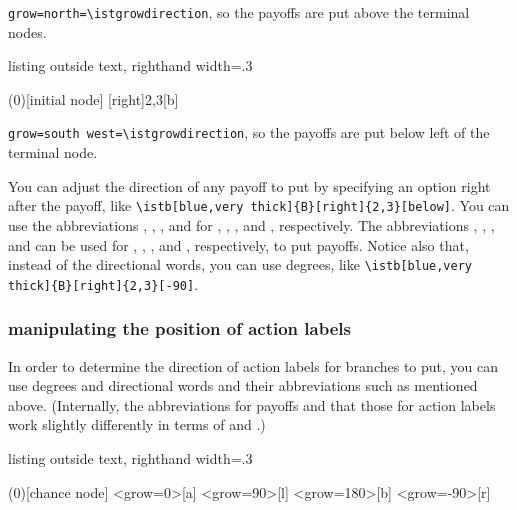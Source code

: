 \verb|grow=north=\istgrowdirection|, so the payoffs are put above the terminal nodes.

\begin{tcblisting}{listing outside text, righthand width=.3\linewidth}
\begin{istgame}
(0)[initial node]
  [right]{2,3}[b]
\endist
\end{istgame}
\end{tcblisting}

\verb|grow=south west=\istgrowdirection|, so the payoffs are put below left of the terminal node.

You can adjust the direction of any payoff to put by specifying an option right after the payoff, like \verb|\istb[blue,very thick]{B}[right]{2,3}[below]|. 
You can use the abbreviations \xword{[l]}, \xword{[r]}, \xword{[a]}, and \xword{[b]} for \xword{[left]}, \xword{[right]}, \xword{[above]}, and \xword{[below]}, respectively.
The abbreviations \xword{[al]}, \xword{[ar]}, \xword{[bl]}, and \xword{[br]} can be used
for , , , and , respectively,
to put payoffs. Notice also that, instead of the directional words, you can use degrees, like \verb|\istb[blue,very thick]{B}[right]{2,3}[-90]|.


\subsubsection*{manipulating the position of action labels}

In order to determine the direction of action labels for branches to put, you can use degrees and directional words and their abbreviations such as mentioned above.
(Internally, the abbreviations for payoffs and that those for action labels work slightly differently in terms of  and .)


\begin{tcblisting}{listing outside text, righthand width=.3\linewidth}
\begin{istgame}[scale=1.2]
\xtShowTerminalNodes
\xtdistance{12mm}{16mm}
\istroot(0)[chance node]
  \istb<grow=0>{}[a]
  \istb<grow=90>{}[l]
  \istb<grow=180>{}[b]
  \istb<grow=-90>{}[r]
  \endist
\end{istgame}
\end{tcblisting}

